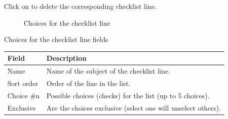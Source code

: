 \documentclass[letterpaper,10pt,english]{sphinxmanual}
\begin{document}
Click on  to delete the corresponding checklist line.
\begin{figure}[htbp]
\centering
\capstart

\caption{Choices for the checklist line}\end{figure}


\begin{threeparttable}
\capstart\caption{Choices for the checklist line fields}
\label{ControlAutomation:id2}
\begin{tabulary}{\linewidth}{|l|l|}
\hline
\textsf{\relax 
Field
} & \textsf{\relax 
Description
}\\
\hline
Name
 & 
Name of the subject of the checklist line.
\\
\hline
Sort order
 & 
Order of the line in the list.
\\
\hline
Choice \#n
 & 
Possible choices (checks) for the list (up to 5 choices).
\\
\hline
Exclusive
 & 
Are the choices exclusive (select one will unselect others).
\\
\hline\end{tabulary}

\end{threeparttable}
\end{document}
